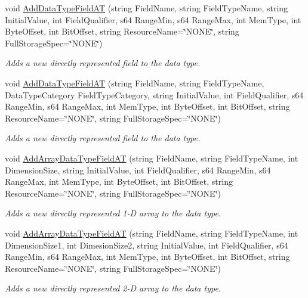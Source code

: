 \begin{DoxyCompactItemize}
void \hyperlink{classpc__emulator_1_1PCDataType_a21f3f1c40dfd1b67affa8235f4552dc3}{Add\+Data\+Type\+Field\+AT} (string Field\+Name, string Field\+Type\+Name, string Initial\+Value, int Field\+Qualifier, s64 Range\+Min, s64 Range\+Max, int Mem\+Type, int Byte\+Offset, int Bit\+Offset, string Resource\+Name=\char`\"{}N\+O\+NE\char`\"{}, string Full\+Storage\+Spec=\char`\"{}N\+O\+NE\char`\"{})
\begin{DoxyCompactList}\small\item\em Adds a new directly represented field to the data type. \end{DoxyCompactList}\item 
void \hyperlink{classpc__emulator_1_1PCDataType_a0c881ea4da972ecb097a66d98c6bc0e4}{Add\+Data\+Type\+Field\+AT} (string Field\+Name, string Field\+Type\+Name, Data\+Type\+Category Field\+Type\+Category, string Initial\+Value, int Field\+Qualifier, s64 Range\+Min, s64 Range\+Max, int Mem\+Type, int Byte\+Offset, int Bit\+Offset, string Resource\+Name=\char`\"{}N\+O\+NE\char`\"{}, string Full\+Storage\+Spec=\char`\"{}N\+O\+NE\char`\"{})
\begin{DoxyCompactList}\small\item\em Adds a new directly represented field to the data type. \end{DoxyCompactList}\item 
void \hyperlink{classpc__emulator_1_1PCDataType_a1bc8641e21df139359339eb72ee236fc}{Add\+Array\+Data\+Type\+Field\+AT} (string Field\+Name, string Field\+Type\+Name, int Dimension\+Size, string Initial\+Value, int Field\+Qualifier, s64 Range\+Min, s64 Range\+Max, int Mem\+Type, int Byte\+Offset, int Bit\+Offset, string Resource\+Name=\char`\"{}N\+O\+NE\char`\"{}, string Full\+Storage\+Spec=\char`\"{}N\+O\+NE\char`\"{})
\begin{DoxyCompactList}\small\item\em Adds a new directly represented 1-\/D array to the data type. \end{DoxyCompactList}\item 
void \hyperlink{classpc__emulator_1_1PCDataType_a1c580eff0b4ac72372a9866fd2212ba3}{Add\+Array\+Data\+Type\+Field\+AT} (string Field\+Name, string Field\+Type\+Name, int Dimension\+Size1, int Dimesion\+Size2, string Initial\+Value, int Field\+Qualifier, s64 Range\+Min, s64 Range\+Max, int Mem\+Type, int Byte\+Offset, int Bit\+Offset, string Resource\+Name=\char`\"{}N\+O\+NE\char`\"{}, string Full\+Storage\+Spec=\char`\"{}N\+O\+NE\char`\"{})
\begin{DoxyCompactList}\small\item\em Adds a new directly represented 2-\/D array to the data type. \end{DoxyCompactList}\item 

\end{DoxyCompactItemize}
